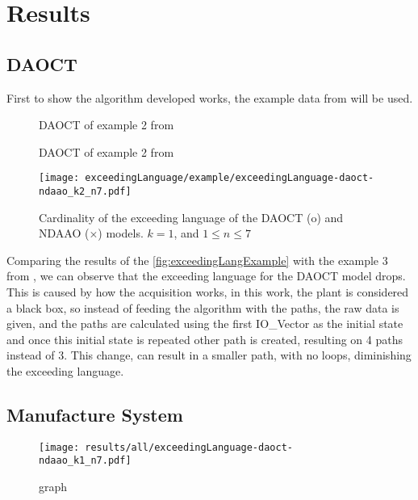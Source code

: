 \chapter{Results}
\label{cha:results}

\section{DAOCT}
\label{sec:results_daoct}

First to show the algorithm developed works, the example data from
\cite{moreira2018enhanced} will be used.
\begin{figure}[H]
  \centering
  \caption{DAOCT of example 2 from }
  \label{fig:exceedingLangExample}
\end{figure}

\begin{figure}[H]
  \centering
  \caption{DAOCT of example 2 from }
  \label{fig:exceedingLangExample}
\end{figure}

\begin{figure}[H]
  \centering
  \texttt{[image: exceedingLanguage/example/exceedingLanguage-daoct-ndaao\_k2\_n7.pdf]}
  \caption{Cardinality of the exceeding language of the DAOCT (o) and NDAAO
    ($\times$) models. $k = 1$, and $1 \leq n \leq 7$}
  \label{fig:exceedingLangExample}
\end{figure}


Comparing the results of the \autoref{fig:exceedingLangExample}  with the
example 3 from \cite{moreira2018enhanced}, we can
observe that the exceeding language for the DAOCT model drops. This is caused by
how the acquisition works, in this work, the plant is considered a black box, so
instead of feeding the algorithm with the
paths, the raw data is given, and the paths are calculated using the first
IO\_Vector as the initial state and once this initial state is repeated other
path 
is created, resulting on 4 paths instead of 3. This change, can result in a
smaller path, with no loops, diminishing the exceeding language.


\section{Manufacture System}
\label{sec:results_system}

\begin{figure}[H]
  \centering
  \texttt{[image: results/all/exceedingLanguage-daoct-ndaao\_k1\_n7.pdf]}
  \caption{graph}
\end{figure}

